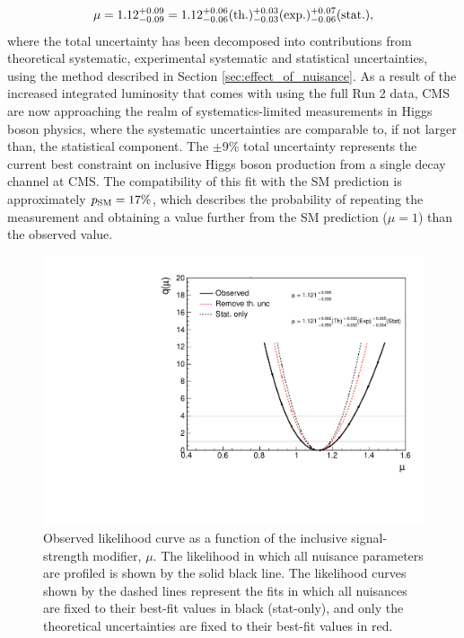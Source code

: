 \begin{equation*}
  \mu = 1.12 ^{+0.09}_{-0.09} = 1.12 ^{+0.06}_{-0.06}({\rm{th.}}) ^{+0.03}_{-0.03}({\rm{exp.}}) ^{+0.07}_{-0.06}({\rm{stat.}}),
\end{equation*}
\noindent
where the total uncertainty has been decomposed into contributions from theoretical systematic, experimental systematic and statistical uncertainties, using the method described in Section \ref{sec:effect_of_nuisance}. As a result of the increased integrated luminosity that comes with using the full Run 2 data, CMS are now approaching the realm of systematics-limited measurements in Higgs boson physics, where the systematic uncertainties are comparable to, if not larger than, the statistical component. The $\pm$9\% total uncertainty represents the current best constraint on inclusive Higgs boson production from a single decay channel at CMS. The compatibility of this fit with the SM prediction is approximately $p_{\rm{SM}}=17\%$, which describes the probability of repeating the measurement and obtaining a value further from the SM prediction ($\mu=1$) than the observed value.

\begin{figure}
  \centering
  \includegraphics[width=.6\textwidth]{Figures/hgg_results/likelihood_mu.pdf}
  \caption[Observed likelihood curve for the inclusive signal-strength]
  {
    Observed likelihood curve as a function of the inclusive signal-strength modifier, $\mu$. The likelihood in which all nuisance parameters are profiled is shown by the solid black line. The likelihood curves shown by the dashed lines represent the fits in which all nuisances are fixed to their best-fit values in black (stat-only), and only the theoretical uncertainties are fixed to their best-fit values in red.
  }
  \label{fig:likelihood_mu_inclusive}
\end{figure}

